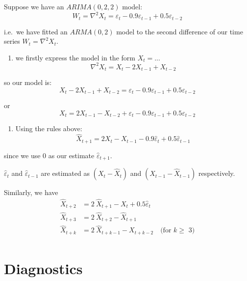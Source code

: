 \documentclass[12pt,a4paper,openany,twoside]{report}
\providecommand{\tightlist}{%
  \setlength{\itemsep}{0pt}\setlength{\parskip}{0pt}}
\theoremstyle{definition}
\theoremstyle{remark}
\theoremstyle{plain}
\theoremstyle{definition}
\theoremstyle{definition}
\theoremstyle{definition}
\theoremstyle{remark}
\let\BeginKnitrBlock\begin \let\EndKnitrBlock\end
\begin{document}
\BeginKnitrBlock{example}[ARIMA(0,2,2) forecast]
\protect\hypertarget{exm:arimaforex}{}{\label{exm:arimaforex} {} }
Suppose we have an \(ARIMA(0,2,2)\) model:
\[W_{t} = \nabla^{2}X_{t} = \varepsilon_{t} - 0.9\varepsilon_{t - 1} + 0.5\varepsilon_{t - 2}\]

i.e.~we have fitted an \(ARMA(0,2)\) model to the second difference of
our time series \(W_{t} = \nabla^{2}X_{t}\).

\begin{enumerate}
\def\labelenumi{\arabic{enumi}.}
\tightlist
\item
  we firstly express the model in the form \(X_{t} = ...\)
  \[\nabla^{2}X_{t} = X_{t} - 2X_{t - 1} + X_{t - 2}\]
\end{enumerate}

so our model is:
\[X_{t} - 2X_{t - 1} + X_{t - 2} = \varepsilon_{t} - 0.9\varepsilon_{t - 1} + 0.5\varepsilon_{t - 2}\]

or
\[X_{t} = 2X_{t - 1} - X_{t - 2} + \varepsilon_{t} - 0.9\varepsilon_{t - 1} + 0.5\varepsilon_{t - 2}\]

\begin{enumerate}
\def\labelenumi{\arabic{enumi}.}
\setcounter{enumi}{1}
\tightlist
\item
  Using the rules above:
  \[{\hat{X}}_{t + 1} = 2X_{t} - X_{t - 1} - 0.9{\hat{\varepsilon}}_{t} + 0.5{\hat{\varepsilon}}_{t - 1}\]
\end{enumerate}

since we use 0 as our estimate \(\hat{\varepsilon}_{t + 1}\).

\(\hat{\varepsilon}_{t}\) and \(\hat{\varepsilon}_{t - 1}\) are estimated as \(\left( X_{t} - {\hat{X}}_{t} \right)\) and \((X_{t - 1} - {\hat{X}}_{t - 1})\) respectively.

Similarly, we have
\begin{align*}
\hat{X}_{t + 2} & = 2 \ \hat{X}_{t + 1} - X_{t} + 0.5\hat{\varepsilon}_{t} \\
\hat{X}_{t + 3} & = 2 \ \hat{X}_{t + 2} - \hat{X}_{t + 1}\\
\hat{X}_{t + k} & = 2 \ \hat{X}_{t + k - 1} - X_{t+k-2} \quad \mbox{(for $k \geq$ 3)} \\
\end{align*}
\EndKnitrBlock{example}

\hypertarget{arimadiag}{%
\section{Diagnostics}\label{arimadiag}}
\end{document}
